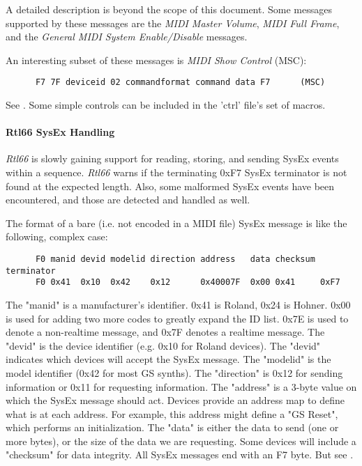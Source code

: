    A detailed description is beyond the scope of this document.
   Some messages supported by these messages are the
   \textsl{MIDI Master Volume},
   \textsl{MIDI Full Frame},
   and the \textsl{General MIDI System Enable/Disable}
   messages.

   An interesting subset of these messages is \textsl{MIDI Show Control}
   (MSC):

   \begin{verbatim}
      F7 7F deviceid 02 commandformat command data F7      (MSC)
   \end{verbatim}

   See \cite{msc}.
   Some simple controls can be included in the 'ctrl' file's set of macros.

\paragraph{Rtl66 SysEx Handling}
\label{paragraph:midi_seq66_sysex_handling}

   \textsl{Rtl66} is slowly gaining support for reading, storing, and
   sending SysEx events within a sequence.
   \textsl{Rtl66} warns if the
   terminating 0xF7 SysEx terminator is not found at the expected length.
   Also, some malformed SysEx events have been encountered, and those are
   detected and handled as well.

   The format of a bare (i.e. not encoded in a MIDI file) SysEx message is
   like the following, complex case:

   \begin{verbatim}
      F0 manid devid modelid direction address   data checksum terminator
      F0 0x41  0x10  0x42    0x12      0x40007F  0x00 0x41     0xF7
   \end{verbatim}

   The "manid" is a manufacturer's identifier. 0x41 is Roland, 0x24 is
   Hohner. 0x00 is used for adding two more codes to greatly expand the ID
   list. 0x7E is used to denote a non-realtime message, and 0x7F denotes
   a realtime message.
   The "devid" is the device identifier (e.g. 0x10 for Roland devices).
   The "devid" indicates which devices will accept the SysEx message.
   The "modelid" is the model identifier (0x42 for most GS synths).
   The "direction" is 0x12 for sending information or 0x11 for requesting
   information.
   The "address" is a 3-byte value on which the SysEx message should act.
   Devices provide an address map to define what is at each address.
   For example, this address might define a "GS Reset", which performs
   an initialization.
   The "data" is either the data to send (one or more bytes), or the
   size of the data we are requesting.
   Some devices will include a "checksum" for data integrity.
   All SysEx messages end with an F7 byte.
   But see .



